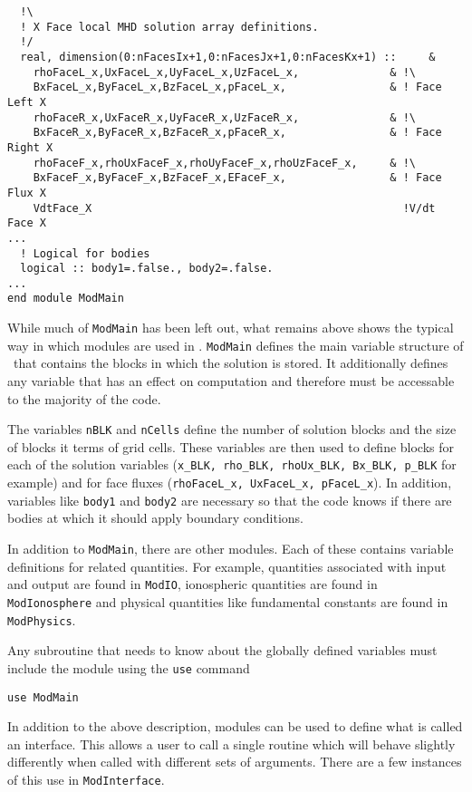 \begin{verbatim}
  !\
  ! X Face local MHD solution array definitions.
  !/
  real, dimension(0:nFacesIx+1,0:nFacesJx+1,0:nFacesKx+1) ::     &
    rhoFaceL_x,UxFaceL_x,UyFaceL_x,UzFaceL_x,              & !\
    BxFaceL_x,ByFaceL_x,BzFaceL_x,pFaceL_x,                & ! Face Left X
    rhoFaceR_x,UxFaceR_x,UyFaceR_x,UzFaceR_x,              & !\
    BxFaceR_x,ByFaceR_x,BzFaceR_x,pFaceR_x,                & ! Face Right X
    rhoFaceF_x,rhoUxFaceF_x,rhoUyFaceF_x,rhoUzFaceF_x,     & !\
    BxFaceF_x,ByFaceF_x,BzFaceF_x,EFaceF_x,                & ! Face Flux X
    VdtFace_X                                                !V/dt Face X
...
  ! Logical for bodies
  logical :: body1=.false., body2=.false.
...
end module ModMain
\end{verbatim}
While much of {\tt ModMain} has been left out, what remains above
shows the typical way in which modules are used in \BATSRUS.  {\tt ModMain}
defines the main variable structure of \BATSRUS\ that contains the
blocks in which the solution is stored. It additionally defines any
variable that has an effect on computation and therefore must
be accessable to the majority of the code.  

The variables {\tt nBLK} and {\tt nCells} define the number of solution
blocks and the size of blocks it terms of grid cells.  
These variables are then used to define blocks for each of
the solution variables ({\tt x\_BLK, rho\_BLK, rhoUx\_BLK, Bx\_BLK, p\_BLK} 
for example) and for face fluxes ({\tt rhoFaceL\_x, UxFaceL\_x, pFaceL\_x}).
In addition, variables like {\tt body1} and {\tt body2} are necessary so that
the code knows if there are bodies at which it should apply boundary
conditions.

In addition to {\tt ModMain}, there are other modules.  Each of these contains
variable definitions for related quantities.  For example, quantities 
associated
with input and output are found in {\tt ModIO}, ionospheric quantities are
found in {\tt ModIonosphere} and physical quantities like fundamental
constants are found in {\tt ModPhysics}.

Any subroutine that needs to know about the globally defined 
variables must include the module using the {\tt use}
command
\begin{verbatim}
use ModMain
\end{verbatim}

In addition to the above description, modules can be used to define
what is called an interface.  This allows a user to call a single 
routine which will behave slightly differently when called
with different sets of arguments.  There are a few instances of this
use in {\tt ModInterface}.

